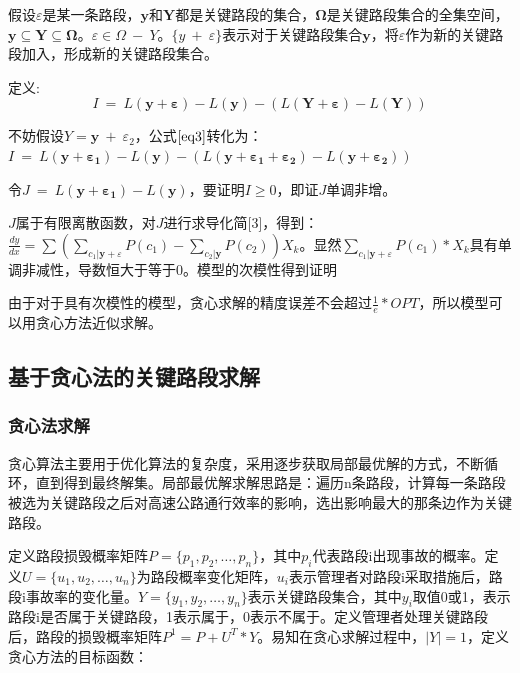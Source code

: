 				假设$\varepsilon$是某一条路段，$\bm{y}$和$\bm{Y}$都是关键路段的集合，$\bm{\Omega}$是关键路段集合的全集空间，$\bm{y} \subseteq \bm{Y} \subseteq \bm{\Omega}$。$\varepsilon \in \Omega \ - \ Y$。$\{y \ + \ \varepsilon\}$表示对于关键路段集合$\bm{y}$，将$\varepsilon$作为新的关键路段加入，形成新的关键路段集合。

				定义:
				\begin{equation}
				I\ =\ L(\bm{y+\varepsilon})-L(\bm{y})-(L(\bm{Y+ \varepsilon}) - L(\bm{Y}))
				\label{eq3}
				\end{equation}

				不妨假设$Y = \bm{y}\ +\ \varepsilon_2$，公式$\ref{eq3}$转化为：$I\ =\ L(\bm{y+\varepsilon_1})-L(\bm{y})-(L(\bm{y+ \varepsilon_1+\varepsilon_2}) - L(\bm{y+\varepsilon_2}))$

				令$J\ =\ L(\bm{y+\varepsilon_1})-L(\bm{y})$，要证明$I \ge 0$，即证$J$单调非增。

				$J$属于有限离散函数，对$J$进行求导化简[3]，得到：$\frac{{dy}}{{dx}} = \sum {(\sum\limits_{{c_1}|\bm{y} + \varepsilon } {P({c_1})}  - \sum\limits_{{c_2}|\bm{y}} {P({c_2})} )} {X_k}$。显然${\sum\limits_{{c_1}|\bm{y} + \varepsilon } {P({c_1})} * X_k}$具有单调非减性，导数恒大于等于0。模型的次模性得到证明

				由于对于具有次模性的模型，贪心求解的精度误差不会超过$\frac{1}{e} * OPT$，所以模型可以用贪心方法近似求解。
			
		\subsection{基于贪心法的关键路段求解}
			
			\subsubsection{贪心法求解}
			贪心算法主要用于优化算法的复杂度，采用逐步获取局部最优解的方式，不断循环，直到得到最终解集。局部最优解求解思路是：遍历n条路段，计算每一条路段被选为关键路段之后对高速公路通行效率的影响，选出影响最大的那条边作为关键路段。

			定义路段损毁概率矩阵$P=\{p_1,p_2,\dots,p_n\}$，其中$p_i$代表路段i出现事故的概率。定义$U=\{u_1,u_2,\dots,u_n\}$为路段概率变化矩阵，$u_i$表示管理者对路段i采取措施后，路段i事故率的变化量。$Y=\{y_1,y_2,\dots,y_n\}$表示关键路段集合，其中$y_i$取值0或1，表示路段i是否属于关键路段，1表示属于，0表示不属于。定义管理者处理关键路段后，路段的损毁概率矩阵$P^1=P+U^T*Y$。易知在贪心求解过程中，$|Y|=1$，定义贪心方法的目标函数：

